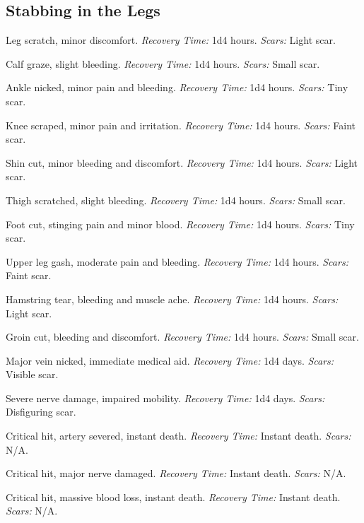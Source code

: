 \subsection{Stabbing in the Legs}

\begin{description}[labelwidth=1.5em, leftmargin=*, itemsep=0.4em]
    \item[1 -] Leg scratch, minor discomfort. \textit{Recovery Time:} 1d4 hours. \textit{Scars:} Light scar.
    \item[2 -] Calf graze, slight bleeding. \textit{Recovery Time:} 1d4 hours. \textit{Scars:} Small scar.
    \item[3 -] Ankle nicked, minor pain and bleeding. \textit{Recovery Time:} 1d4 hours. \textit{Scars:} Tiny scar.
    \item[4 -] Knee scraped, minor pain and irritation. \textit{Recovery Time:} 1d4 hours. \textit{Scars:} Faint scar.
    \item[5 -] Shin cut, minor bleeding and discomfort. \textit{Recovery Time:} 1d4 hours. \textit{Scars:} Light scar.
    \item[6 -] Thigh scratched, slight bleeding. \textit{Recovery Time:} 1d4 hours. \textit{Scars:} Small scar.
    \item[7 -] Foot cut, stinging pain and minor blood. \textit{Recovery Time:} 1d4 hours. \textit{Scars:} Tiny scar.
    \item[8 -] Upper leg gash, moderate pain and bleeding. \textit{Recovery Time:} 1d4 hours. \textit{Scars:} Faint scar.
    \item[9 -] Hamstring tear, bleeding and muscle ache. \textit{Recovery Time:} 1d4 hours. \textit{Scars:} Light scar.
    \item[10 -] Groin cut, bleeding and discomfort. \textit{Recovery Time:} 1d4 hours. \textit{Scars:} Small scar.
    \item[11 -] Major vein nicked, immediate medical aid. \textit{Recovery Time:} 1d4 days. \textit{Scars:} Visible scar.
    \item[12 -] Severe nerve damage, impaired mobility. \textit{Recovery Time:} 1d4 days. \textit{Scars:} Disfiguring scar.
    \item[13 -] Critical hit, artery severed, instant death. \textit{Recovery Time:} Instant death. \textit{Scars:} N/A.
    \item[14 -] Critical hit, major nerve damaged. \textit{Recovery Time:} Instant death. \textit{Scars:} N/A.
    \item[15 -] Critical hit, massive blood loss, instant death. \textit{Recovery Time:} Instant death. \textit{Scars:} N/A.

\end{description}
